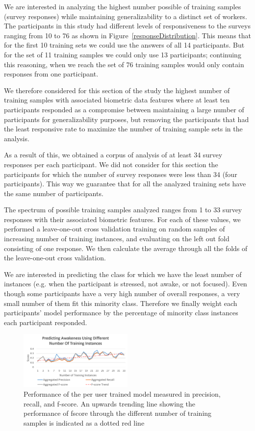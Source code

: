 We are interested in analyzing the highest 
number possible of training samples (survey responses) while
maintaining generalizability to a distinct set of workers.
The participants in this study had different levels of responsiveness to the surveys ranging from 10 to 76 as shown
in Figure~\ref{responseDistribution}. This means that
for the first 10 training sets we could use the
answers of all 14 participants. But for the set of 11 training
samples we could only use 13 participants; continuing
this reasoning, when we reach the set of 76 training samples
would only contain responses from one participant.

We therefore considered for this section of the study the highest number of training samples
with associated biometric data features
where at least ten participants responded as a 
compromise between maintaining a large number of participants for generalizability purposes, but removing the participants that
had the least responsive rate to maximize the number of
training sample sets in the analysis.

As a result of this, we obtained a corpus of analysis of at least 34 survey responses per
each participant. We did not consider for this section
the participants for which 
the number of survey responses were less than 34 (four participants). This way we guarantee that for all the 
analyzed training sets have the same number of participants. 

The spectrum of possible training samples analyzed ranges
from 1 to 33 survey responses with their associated 
biometric features.
For each of these values, we performed a leave-one-out
cross validation training on random samples of increasing 
number of training instances, and evaluating
on the left out fold consisting of one response. We then calculate the average
through all the folds of the leave-one-out cross validation.

We are interested in predicting the class for which we have the least
number of instances (e.g. when the participant is stressed, not
awake, or not focused). Even though some participants have a very high
number of overall responses, a very small number of them fit this minority class. Therefore we finally weight each participants' model performance by the percentage of minority class instances
each participant responded.

\begin{figure}
  \centering
          \includegraphics[width=0.5\textwidth]{20180912AwakenessLC2.png}
  \caption{
Performance of the per user trained model measured in precision, recall,
  and f-score. An upwards trending line showing the performance of fscore through the
  different number of training samples is indicated as a dotted red line
  }
   \label{learningCurvet}
\end{figure}

